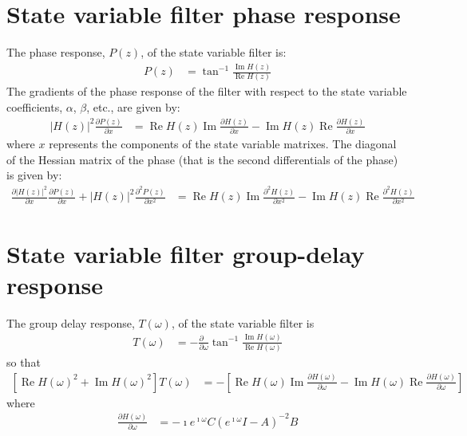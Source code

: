 \documentclass[a4paper,twoside,10pt,english]{report}
\begin{document}
\section{\label{app:State-variable-filter-phase-response}State  variable filter phase response}
The phase response, $P\left(z\right)$, of the state variable filter is:
\begin{align*}
P\left(z\right)&=\tan^{-1}\frac{\operatorname{Im}H\left(z\right)}
{\operatorname{Re}H\left(z\right)}
\end{align*}
The gradients of the phase response of the filter with respect to 
the state variable coefficients, $\alpha$, $\beta$, etc., are given by:
\begin{align*}
\left|H\left(z\right)\right|^{2}
\frac{\partial{}P\left(z\right)}{\partial{}x}&=
\operatorname{Re}H\left(z\right)
\operatorname{Im}\frac{\partial{}H\left(z\right)}{\partial{}x}-
\operatorname{Im}H\left(z\right)
\operatorname{Re}\frac{\partial{}H\left(z\right)}{\partial{}x}
\end{align*}
where $x$ represents the components of the state variable matrixes.
The diagonal of the Hessian matrix of the phase (that is the second
differentials of the phase) is given by:
\begin{align*}
\frac{\partial\left|H\left(z\right)\right|^{2}}{\partial{}x}
\frac{\partial{}P\left(z\right)}{\partial{}x}+
\left|H\left(z\right)\right|^{2}
\frac{\partial^{2}P\left(z\right)}{\partial{}x^{2}}&=
\operatorname{Re}H\left(z\right)
\operatorname{Im}\frac{\partial^{2}H\left(z\right)}{\partial{}x^{2}}-
\operatorname{Im}H\left(z\right)
\operatorname{Re}\frac{\partial^{2}H\left(z\right)}{\partial{}x^{2}}
\end{align*}

\section{\label{app:State-variable-filter-group-delay-response}State  variable filter group-delay response}
The group delay response, $T\left(\omega\right)$, of the state variable filter is
\begin{align*}
T\left(\omega\right) &= -\frac{\partial\phantom{\omega}}{\partial\omega}
\tan^{-1}\frac{\operatorname{Im}H\left(\omega\right)}
{\operatorname{Re}H\left(\omega\right)}
\end{align*}
so that
\begin{align*}
\left[\operatorname{Re}H\left(\omega\right)^{2}+
\operatorname{Im}H\left(\omega\right)^{2}\right]T\left(\omega\right) &= 
-\left[
\operatorname{Re}H\left(\omega\right)
\operatorname{Im}\frac{\partial H\left(\omega\right)}{\partial\omega} -
\operatorname{Im}H\left(\omega\right)
\operatorname{Re}\frac{\partial H\left(\omega\right)}{\partial\omega}
\right]
\end{align*}
where 
\begin{align*}
\frac{\partial{}H\left(\omega\right)}{\partial\omega}&=
-\imath e^{\imath\omega}C\left(e^{\imath\omega}I-A\right)^{-2}B
\end{align*}
\end{document}

